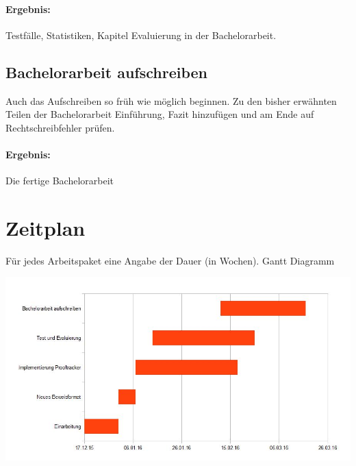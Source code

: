 \documentclass[a4paper]{article}
\begin{document}
\paragraph{Ergebnis:}
Testfälle, Statistiken,
Kapitel Evaluierung in der Bachelorarbeit.

\subsection{Bachelorarbeit aufschreiben}

Auch das Aufschreiben so früh wie möglich beginnen.
Zu den bisher erwähnten Teilen der Bachelorarbeit Einführung, Fazit hinzufügen und am Ende auf 
Rechtschreibfehler prüfen.

\paragraph{Ergebnis:}
Die fertige Bachelorarbeit


\section{Zeitplan}

Für jedes Arbeitspaket eine Angabe der Dauer (in Wochen).
Gantt Diagramm

\centerline{\includegraphics[scale=0.5]{Ganttchart}}



\end{document}
